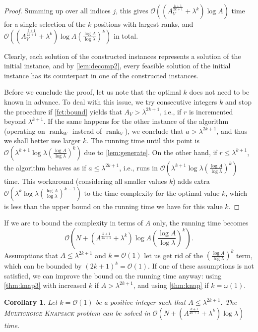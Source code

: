 \documentclass{article}
\theoremstyle{plain}
\newtheorem{corollary}[theorem]{Corollary}
\theoremstyle{definition}
\newcommand{\MK}{\textsc{Multichoice Knapsack}\xspace}
\newcommand{\Oh}{\mathcal{O}}
\DeclareMathOperator*{\rank}{rank}
\begin{document}
\begin{proof}
    Summing up over all indices $j$, this gives $\Oh((A_V^{\frac{k+1}{2k+1}} + \lambda^k)\log A)$ time
    for a single selection of the $k$ positions with largest ranks,
    and $\Oh((A_V^{\frac{k+1}{2k+1}} + \lambda^k)\log A (\frac{\log A}{\log \lambda})^{k})$ in total.
       
    Clearly, each solution of the constructed instances represents a solution of the initial instance,
    and by \cref{lem:decomp2}, every feasible solution of the initial instance has its counterpart in one of the constructed instances. 
  
      Before we conclude the proof, let us note that the optimal $k$ does not need to be known in advance. 
    To deal with this issue, we try consecutive integers $k$ and stop the procedure if
    \cref{fct:bound} yields that $A_V > \lambda^{2k+1}$, i.e., if $r$ is incremented beyond $\lambda^{k+1}$.
    If the same happens for the other instance of the algorithm (operating on $\rank_W$ instead of $\rank_V$), we conclude that $a>\lambda^{2k+1}$,
    and thus we shall better use larger $k$. 
    The running time until this point is $\Oh(\lambda^{k+1}\log\lambda (\frac{\log A}{\log \lambda})^k)$ due to \cref{lem:generate}. 
    On the other hand, if $r\le \lambda^{k+1}$, the algorithm behaves as if $a \le  \lambda^{2k+1}$, i.e., runs in $\Oh(\lambda^{k+1}\log\lambda (\frac{\log A}{\log \lambda})^k)$ time.
     This workaround (considering all smaller values $k$) adds extra $\Oh(\lambda^{k}\log\lambda (\frac{\log A}{\log \lambda})^{k-1})$
    to the time complexity for the optimal value $k$, which is less than the upper bound on the running time we have for this value $k$.
      \end{proof}
    
  
    If we are to bound the complexity in terms of $A$ only, the running time becomes
    $${\Oh(N+ {(A^{\frac{k+1}{2k+1}}+\lambda^k)}\log A (\frac{\log A}{\log \lambda})^{k})}.$$
    Assumptions that $A\le \lambda^{2k+1}$ and $k=\Oh(1)$ let us get rid of the $(\frac{\log A}{\log \lambda})^{k}$ term, which can be bounded by $(2k+1)^k=\Oh(1)$.
    If one of these assumptions is not satisfied, we can improve the bound on the running time anyway:
    using \cref{thm:knap3} with increased $k$ if $A> \lambda^{2k+1}$, and using \cref{thm:knap} if $k=\omega(1)$.
    
    \begin{corollary}
    Let $k=\Oh(1)$ be a positive integer such that $A\le \lambda^{2k+1}$. The \MK problem can be solved in $\Oh(N+ {(A^{\frac{k+1}{2k+1}}+\lambda^k)}\log \lambda)$ time.
    \end{corollary}
    
\end{document}
